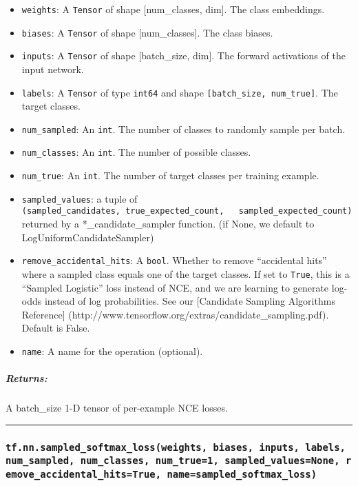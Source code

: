 \begin{itemize}
\tightlist
\item
  \texttt{weights}: A \texttt{Tensor} of shape {[}num\_classes, dim{]}.
  The class embeddings.
\item
  \texttt{biases}: A \texttt{Tensor} of shape {[}num\_classes{]}. The
  class biases.
\item
  \texttt{inputs}: A \texttt{Tensor} of shape {[}batch\_size, dim{]}.
  The forward activations of the input network.
\item
  \texttt{labels}: A \texttt{Tensor} of type \texttt{int64} and shape
  \texttt{{[}batch\_size,\ num\_true{]}}. The target classes.
\item
  \texttt{num\_sampled}: An \texttt{int}. The number of classes to
  randomly sample per batch.
\item
  \texttt{num\_classes}: An \texttt{int}. The number of possible
  classes.
\item
  \texttt{num\_true}: An \texttt{int}. The number of target classes per
  training example.
\item
  \texttt{sampled\_values}: a tuple of
  \texttt{(sampled\_candidates,\ true\_expected\_count,\ \ \ sampled\_expected\_count)}
  returned by a *\_candidate\_sampler function. (if None, we default to
  LogUniformCandidateSampler)
\item
  \texttt{remove\_accidental\_hits}: A \texttt{bool}. Whether to remove
  ``accidental hits'' where a sampled class equals one of the target
  classes. If set to \texttt{True}, this is a ``Sampled Logistic'' loss
  instead of NCE, and we are learning to generate log-odds instead of
  log probabilities. See our {[}Candidate Sampling Algorithms
  Reference{]}
  (http://www.tensorflow.org/extras/candidate\_sampling.pdf). Default is
  False.
\item
  \texttt{name}: A name for the operation (optional).
\end{itemize}

\subparagraph{Returns: }\label{returns-23}

A batch\_size 1-D tensor of per-example NCE losses.

\begin{center}\rule{0.5\linewidth}{\linethickness}\end{center}

\subsubsection{\texorpdfstring{\texttt{tf.nn.sampled\_softmax\_loss(weights,\ biases,\ inputs,\ labels,\ num\_sampled,\ num\_classes,\ num\_true=1,\ sampled\_values=None,\ remove\_accidental\_hits=True,\ name=\textquotesingle{}sampled\_softmax\_loss\textquotesingle{})}
}{tf.nn.sampled\_softmax\_loss(weights, biases, inputs, labels, num\_sampled, num\_classes, num\_true=1, sampled\_values=None, remove\_accidental\_hits=True, name='sampled\_softmax\_loss') }}\label{tf.nn.sampledux5fsoftmaxux5flossweights-biases-inputs-labels-numux5fsampled-numux5fclasses-numux5ftrue1-sampledux5fvaluesnone-removeux5faccidentalux5fhitstrue-namesampledux5fsoftmaxux5floss}

